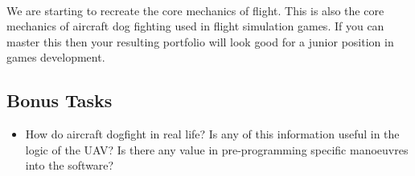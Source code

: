 \documentclass[11pt]{book}
\begin{document}
\paragraph{} We are starting to recreate the core mechanics of flight. This is also the core mechanics of aircraft dog fighting used in flight simulation games. If you can master this then your resulting portfolio will look good for a junior position in games development.

\paragraph{}
\subsection{Bonus Tasks}
\begin{itemize}
\item How do aircraft dogfight in real life? Is any of this information useful in the logic of the UAV? Is there any value in pre-programming specific manoeuvres into the software?
\end{itemize}

\clearpage
\end{document}
